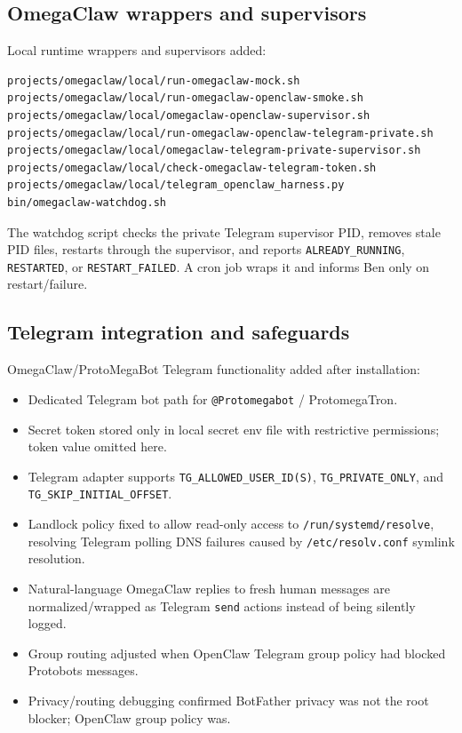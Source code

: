 \documentclass[11pt]{article}
\begin{document}
\subsection{OmegaClaw wrappers and supervisors}

Local runtime wrappers and supervisors added:
\begin{verbatim}
projects/omegaclaw/local/run-omegaclaw-mock.sh
projects/omegaclaw/local/run-omegaclaw-openclaw-smoke.sh
projects/omegaclaw/local/omegaclaw-openclaw-supervisor.sh
projects/omegaclaw/local/run-omegaclaw-openclaw-telegram-private.sh
projects/omegaclaw/local/omegaclaw-telegram-private-supervisor.sh
projects/omegaclaw/local/check-omegaclaw-telegram-token.sh
projects/omegaclaw/local/telegram_openclaw_harness.py
bin/omegaclaw-watchdog.sh
\end{verbatim}

The watchdog script checks the private Telegram supervisor PID, removes stale PID files, restarts through the supervisor, and reports \texttt{ALREADY\_RUNNING}, \texttt{RESTARTED}, or \texttt{RESTART\_FAILED}.  A cron job wraps it and informs Ben only on restart/failure.

\subsection{Telegram integration and safeguards}

OmegaClaw/ProtoMegaBot Telegram functionality added after installation:
\begin{itemize}
  \item Dedicated Telegram bot path for \texttt{@Protomegabot} / ProtomegaTron.
  \item Secret token stored only in local secret env file with restrictive permissions; token value omitted here.
  \item Telegram adapter supports \texttt{TG\_ALLOWED\_USER\_ID(S)}, \texttt{TG\_PRIVATE\_ONLY}, and \texttt{TG\_SKIP\_INITIAL\_OFFSET}.
  \item Landlock policy fixed to allow read-only access to \texttt{/run/systemd/resolve}, resolving Telegram polling DNS failures caused by \texttt{/etc/resolv.conf} symlink resolution.
  \item Natural-language OmegaClaw replies to fresh human messages are normalized/wrapped as Telegram \texttt{send} actions instead of being silently logged.
  \item Group routing adjusted when OpenClaw Telegram group policy had blocked Protobots messages.
  \item Privacy/routing debugging confirmed BotFather privacy was not the root blocker; OpenClaw group policy was.
\end{itemize}
\end{document}
